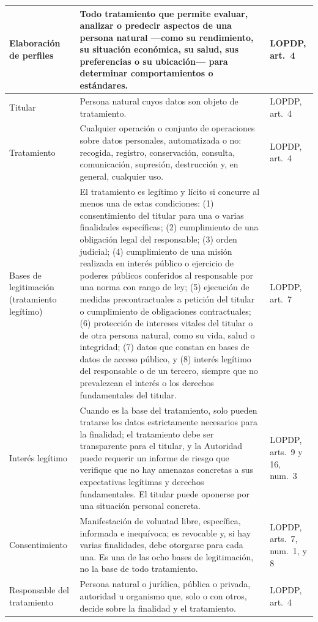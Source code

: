 {\begin{xltabular}{\textwidth}{|>{\raggedright\arraybackslash}p{3.2cm}|L|>{\raggedright\arraybackslash}p{2.6cm}|}
  \hline
  Elaboración de perfiles & Todo tratamiento que permite evaluar, analizar o predecir aspectos de una persona natural ---como su rendimiento, su situación económica, su salud, sus preferencias o su ubicación--- para determinar comportamientos o estándares. & LOPDP, art.~4 \\
  \hline
  Titular & Persona natural cuyos datos son objeto de tratamiento. & LOPDP, art.~4 \\
  \hline
  Tratamiento & Cualquier operación o conjunto de operaciones sobre datos personales, automatizada o no: recogida, registro, conservación, consulta, comunicación, supresión, destrucción y, en general, cualquier uso. & LOPDP, art.~4 \\
  \hline
  Bases de legitimación (tratamiento legítimo) & El tratamiento es legítimo y lícito si concurre al menos una de estas condiciones: (1) consentimiento del titular para una o varias finalidades específicas; (2) cumplimiento de una obligación legal del responsable; (3) orden judicial; (4) cumplimiento de una misión realizada en interés público o ejercicio de poderes públicos conferidos al responsable por una norma con rango de ley; (5) ejecución de medidas precontractuales a petición del titular o cumplimiento de obligaciones contractuales; (6) protección de intereses vitales del titular o de otra persona natural, como su vida, salud o integridad; (7) datos que constan en bases de datos de acceso público, y (8) interés legítimo del responsable o de un tercero, siempre que no prevalezcan el interés o los derechos fundamentales del titular. & LOPDP, art.~7 \\
  \hline
  Interés legítimo & Cuando es la base del tratamiento, solo pueden tratarse los datos estrictamente necesarios para la finalidad; el tratamiento debe ser transparente para el titular, y la Autoridad puede requerir un informe de riesgo que verifique que no hay amenazas concretas a sus expectativas legítimas y derechos fundamentales. El titular puede oponerse por una situación personal concreta. & LOPDP, arts.~9 y 16, num.~3 \\
  \hline
  Consentimiento & Manifestación de voluntad libre, específica, informada e inequívoca; es revocable y, si hay varias finalidades, debe otorgarse para cada una. Es una de las ocho bases de legitimación, no la base de todo tratamiento. & LOPDP, arts.~7, num.~1, y 8 \\
  \hline
  Responsable del tratamiento & Persona natural o jurídica, pública o privada, autoridad u organismo que, solo o con otros, decide sobre la finalidad y el tratamiento. & LOPDP, art.~4 \\

\end{xltabular}}
